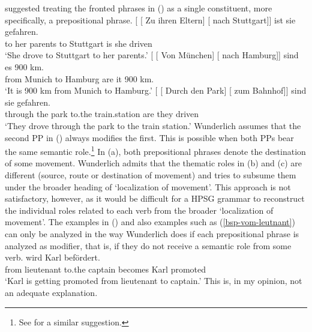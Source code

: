 \citet*[]{Wunderlich84} suggested treating the fronted phrases in () as a single constituent,
more specifically, a prepositional phrase.
\eal
\ex 
\gll {}[ [ Zu ihren Eltern] [ nach Stuttgart]] ist sie gefahren.\\
	{}       {}        to her parents   {}        to Stuttgart is she driven\\
\glt `She drove to Stuttgart to her parents.'
\ex\label{bsp-von-muenchen-nach}
\gll {}[ [ Von München]     [ nach Hamburg]]   sind es 900 km.\\
       {}        {} from Munich  {} to Hamburg are it 900 km.\\
\glt `It is 900 km from Munich to Hamburg.'	
\ex 
\gll {}[ [ Durch den Park]  [ zum Bahnhof]]    sind sie gefahren.\\
	{}       {}        through the park {}        to.the train.station are they driven\\
\glt `They drove through the park to the train station.'
\zl
Wunderlich assumes that the second PP in () always modifies the first. This is possible when both
 PPs bear the same semantic role.\footnote{
        See  for a similar suggestion.%
}
In (a), both prepositional phrases denote the destination of some movement. Wunderlich admits that the
thematic roles in (b) and (c) are different (source, route or destination of movement) and tries to
subsume them under the broader heading of `localization of movement'.
This approach is not satisfactory, however, as it would be difficult for a HPSG grammar to reconstruct the individual roles 
related to each verb from the broader `localization of movement'. The examples in () and also examples such as 
(\ref{bsp-vom-leutnant}) can only be analyzed in the way Wunderlich does if each prepositional
phrase is analyzed as modifier, that is, if they do not receive a semantic role from some verb.
\ea
\label{bsp-vom-leutnant}%
 wird Karl befördert.\\
	 \spacebr{}from lieutenant \spacebr{}to.the captain becomes Karl promoted\\
\glt `Karl is getting promoted from lieutenant to captain.'
\z
This is, in my opinion, not an adequate explanation.




